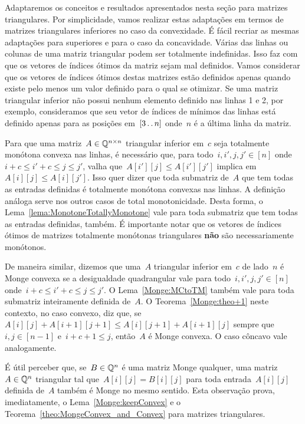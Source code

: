 Adaptaremos os conceitos e resultados apresentados nesta seção para matrizes triangulares. Por simplicidade, vamos realizar estas adaptações em termos de matrizes triangulares inferiores no caso da convexidade. É fácil recriar as mesmas adaptações para superiores e para o caso da concavidade. Várias das linhas ou colunas de uma matriz triangular podem ser totalmente indefinidas. Isso faz com que os vetores de índices ótimos da matriz sejam mal definidos.  Vamos considerar que os vetores de índices ótimos destas matrizes estão definidos apenas quando existe pelo menos um valor definido para o qual se otimizar. Se uma matriz triangular inferior não possui nenhum elemento definido nas linhas 1 e 2, por exemplo, consideramos que seu vetor de índices de mínimos das linhas está definido apenas para as posições em~$[3 \,.\,.\, n]$ onde~$n$ é a última linha da matriz.

Para que uma matriz~$A \in \mathbb{Q}^{n \times n}$ triangular inferior em~$c$ seja totalmente monótona convexa nas linhas, é necessário que, para todo~${ i,i',j,j' \in [n] }$ onde~${ i + c \leq i' + c \leq j \leq j'}$, valha que~${ A[i'][j] \leq A[i'][j'] }$ implica em~${ A[i][j] \leq A[i][j'] }$. Isso quer dizer que toda submatriz de~$A$ que tem todas as entradas definidas é totalmente monótona convexas nas linhas. A definição análoga serve nos outros casos de total monotonicidade. Desta forma, o Lema~\ref{lema:MonotoneTotallyMonotone} 
vale para toda submatriz que tem todas as entradas definidas, também. É importante notar que os vetores de índices ótimos de matrizes totalmente monótonas triangulares \textbf{não} são necessariamente monótonos.

De maneira similar, dizemos que uma~$A$ triangular inferior em~$c$ de lado~$n$ é Monge convexa se a desigualdade quadrangular vale para todo~${ i,i',j,j' \in [n]}$ onde~${ i + c \leq i' + c \leq j \leq j' }$. O Lema~\ref{Monge:MCtoTM} também vale para toda submatriz inteiramente definida de~$A$. O Teorema~\ref{Monge:theo+1} neste contexto, no caso convexo, diz que, se~${ A[i][j] + A[i+1][j+1] \leq A[i][j+1] + A[i+1][j] }$ sempre que~${ i,j \in [n-1] }$ e~${ i + c + 1 \leq j }$, então~$A$ é Monge convexa. O caso côncavo vale analogamente.

É útil perceber que, se~$B \in \mathbb{Q}^n$ é uma matriz Monge qualquer, uma matriz~$A \in \mathbb{Q}^n$ triangular tal que~$A[i][j] = B[i][j]$ para toda entrada~$A[i][j]$ definida de~$A$ também é Monge no mesmo sentido. Esta observação prova, imediatamente, o Lema~\ref{Monge:keepConvex} e o Teorema~\ref{theo:MongeConvex_and_Convex} para matrizes triangulares.
